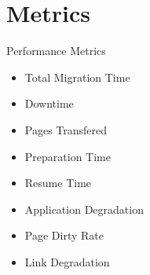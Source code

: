 \section{Metrics}

	\begin{frame}[fragile]{Performance Metrics}

		\begin{itemize}
			\setlength \itemsep{0.7em}
			\item Total Migration Time
			\item Downtime
			\item Pages Transfered
			\item Preparation Time
			\item Resume Time
			\item Application Degradation
			\item Page Dirty Rate 
			\item Link Degradation
		\end{itemize}

	\end{frame}

